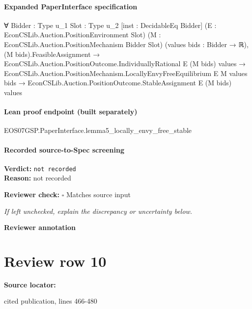 \documentclass[10pt]{article}
\newcommand{\reviewerbox}{%
  \par\noindent\fbox{\parbox{0.96\linewidth}{\rule{0pt}{0.38in}}}\par
}
\newcommand{\reviewmatch}[1]{%
  \par\noindent\textbf{Reviewer check:} $\square$\; #1\par
  \noindent\emph{If left unchecked, explain the discrepancy or uncertainty below.}\par
}
\begin{document}
\paragraph{Expanded PaperInterface specification}
\begin{ReviewVerbatim}
∀ {Bidder : Type u_1} {Slot : Type u_2} [inst : DecidableEq Bidder] (E : EconCSLib.Auction.PositionEnvironment Slot)
  (M : EconCSLib.Auction.PositionMechanism Bidder Slot) (values bids : Bidder → ℝ),
  (M bids).FeasibleAssignment →
    EconCSLib.Auction.PositionOutcome.IndividuallyRational E (M bids) values →
      EconCSLib.Auction.PositionMechanism.LocallyEnvyFreeEquilibrium E M values bids →
        EconCSLib.Auction.PositionOutcome.StableAssignment E (M bids) values
\end{ReviewVerbatim}

\paragraph{Lean proof endpoint (built separately)}\begin{ReviewVerbatim}
EOS07GSP.PaperInterface.lemma5_locally_envy_free_stable
\end{ReviewVerbatim}

\paragraph{Recorded source-to-Spec screening}
\textbf{Verdict:} \texttt{not recorded}
\\
\textbf{Reason:} not recorded
\reviewmatch{Matches source input}
\noindent\textbf{Reviewer annotation}\par
\reviewerbox
\clearpage
\hypertarget{source-claim-68ba4a4971219ea9}{}
\section*{Review row 10}
\textbf{Source locator:} {\footnotesize\raggedright cited publication, lines 466-\allowbreak{}480\par}
\end{document}
